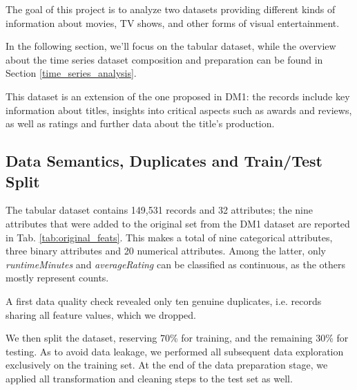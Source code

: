 The goal of this project is to analyze two datasets providing different kinds of information about movies, TV shows, and other forms of visual entertainment.

In the following section, we'll focus on the tabular dataset, while the overview about the time series dataset composition and preparation can be found in Section \ref{time_series_analysis}.

This dataset is an extension of the one proposed in DM1: the records include key information about titles, insights into critical aspects such as awards and reviews, as well as ratings and further data about the title's production.

\subsection{Data Semantics, Duplicates and Train/Test Split}

The tabular dataset contains 149,531 records and 32 attributes; the nine attributes that were added to the original set from the DM1 dataset are reported in Tab. {\ref{tab:original_feats}}. This makes a total of nine categorical attributes, three binary attributes and 20 numerical attributes. Among the latter, only \textit{runtimeMinutes} and \textit{averageRating} can be classified as continuous, as the others mostly represent counts.

A first data quality check revealed only ten genuine duplicates, i.e. records sharing all feature values, which we dropped.

We then split the dataset, reserving 70\% for training, and the remaining 30\% for testing. As to avoid data leakage, we performed all subsequent data exploration exclusively on the training set. At the end of the data preparation stage, we applied all transformation and cleaning steps to the test set as well.

